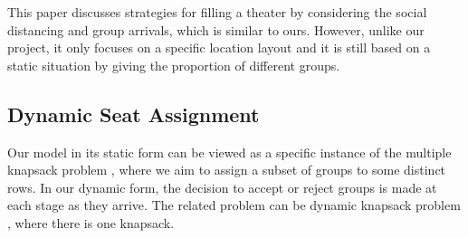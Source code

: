 This paper \cite{blom2022filling} discusses strategies for filling a theater by considering the social distancing and group arrivals, which is similar to ours. However, unlike our project, it only focuses on a specific location layout and it is still based on a static situation by giving the proportion of different groups.





\subsection{Dynamic Seat Assignment}
Our model in its static form can be viewed as a specific instance of the multiple knapsack problem \cite{pisinger1999exact}, where we aim to assign a subset of groups to some distinct rows. In our dynamic form, the decision to accept or reject groups is made at each stage as they arrive. The related problem can be dynamic knapsack problem \cite{kleywegt1998dynamic}, where there is one knapsack.



